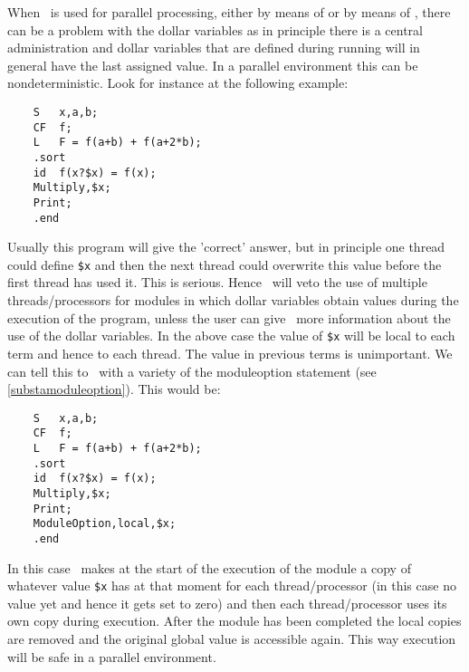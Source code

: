When \FORM\ is used for parallel processing, 
either by means of \ParFORM{} or by means of 
\TFORM{}, there can be a problem with the dollar variables as in 
principle there is a central administration and dollar variables that are 
defined during running will in general have the last assigned value. In a 
parallel environment this can be nondeterministic. 
Look for instance at the following example:
\begin{verbatim}
    S   x,a,b;
    CF  f;
    L   F = f(a+b) + f(a+2*b);
    .sort
    id  f(x?$x) = f(x);
    Multiply,$x;
    Print;
    .end
\end{verbatim}
Usually this program will give the 'correct' answer, but in principle one 
thread could define \verb:$x: and then the next thread could overwrite this 
value before the first thread has used it. This is serious. Hence \FORM\ 
will veto the use of multiple threads/processors for modules in 
which dollar variables obtain values during the execution of the program, 
unless the user can give \FORM\ more information about the use of the 
dollar variables. In the above case the value of \verb:$x: will be local to 
each term and hence to each thread\index{thread}. The value in previous 
terms is unimportant. We can tell this to \FORM\ with a variety of the 
moduleoption\index{moduleoption} statement (see \ref{substamoduleoption}). 
This would be:
\begin{verbatim}
    S   x,a,b;
    CF  f;
    L   F = f(a+b) + f(a+2*b);
    .sort
    id  f(x?$x) = f(x);
    Multiply,$x;
    Print;
    ModuleOption,local,$x;
    .end
\end{verbatim}
In this case \FORM\ makes at the start of the execution of the module a 
copy of whatever value \verb:$x: has at that moment for each 
thread/processor (in this case no value yet and hence it gets set to zero) 
and then each thread/processor uses its own copy during execution. After 
the module has been completed the local copies are removed and the original 
global value is accessible again. This way execution will be safe in a 
parallel environment.

